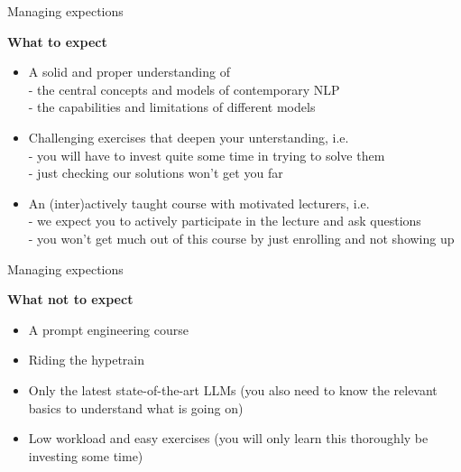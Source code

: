 \begin{vbframe}{Managing expections}

\vfill

\textbf{What to expect}

	\begin{itemize}
		\item A solid and proper understanding of\\
		- the central concepts and models of contemporary NLP\\
		- the capabilities and limitations of different models
		\item Challenging exercises that deepen your unterstanding, i.e.\\
		- you will have to invest quite some time in trying to solve them\\
		- just checking our solutions won't get you far
		\item An (inter)actively taught course with motivated lecturers, i.e.\\
		- we expect you to actively participate in the lecture and ask questions\\
		- you won't get much out of this course by just enrolling and not showing up
	\end{itemize}


\vfill

\end{vbframe}


\begin{vbframe}{Managing expections}

\vfill

\textbf{What not to expect}

	\begin{itemize}
		\item A prompt engineering course
		\item Riding the hypetrain
		\item Only the latest state-of-the-art LLMs (you also need to know the relevant basics to understand what is going on)
		\item Low workload and easy exercises (you will only learn this thoroughly be investing some time)
	\end{itemize}

\vfill

\end{vbframe}


